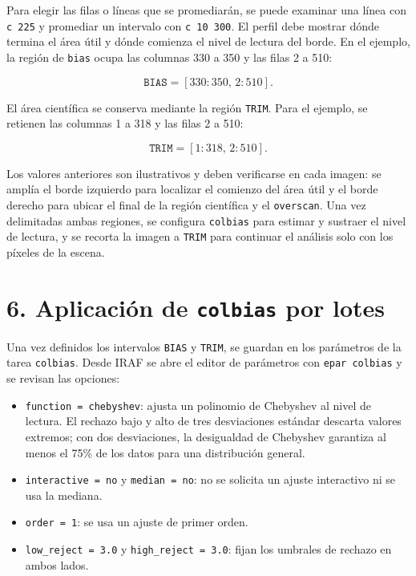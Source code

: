 \documentclass[11pt,twocolumn]{article}
\begin{document}
Para elegir las filas o líneas que se promediarán, se puede examinar una línea
con \texttt{c 225} y promediar un intervalo con \texttt{c 10 300}. El perfil
debe mostrar dónde termina el área útil y dónde comienza el nivel de lectura
del borde. En el ejemplo, la región de \texttt{bias} ocupa las columnas 330 a
350 y las filas 2 a 510:

\[
  \texttt{BIAS} = [330:350,\,2:510].
\]

El área científica se conserva mediante la región \texttt{TRIM}. Para el
ejemplo, se retienen las columnas 1 a 318 y las filas 2 a 510:

\[
  \texttt{TRIM} = [1:318,\,2:510].
\]

Los valores anteriores son ilustrativos y deben verificarse en cada imagen:
se amplía el borde izquierdo para localizar el comienzo del área útil y el
borde derecho para ubicar el final de la región científica y el
\texttt{overscan}. Una vez delimitadas ambas regiones, se configura
\texttt{colbias} para estimar y sustraer el nivel de lectura, y se recorta la
imagen a \texttt{TRIM} para continuar el análisis solo con los píxeles de la
escena.


\section*{6. Aplicación de \texttt{colbias} por lotes}

Una vez definidos los intervalos \texttt{BIAS} y \texttt{TRIM}, se guardan en
los parámetros de la tarea \texttt{colbias}. Desde IRAF se abre el editor de
parámetros con \texttt{epar colbias} y se revisan las opciones:

\begin{itemize}
  \item \texttt{function = chebyshev}: ajusta un polinomio de Chebyshev al
  nivel de lectura. El rechazo bajo y alto de tres desviaciones estándar
  descarta valores extremos; con dos desviaciones, la desigualdad de
  Chebyshev garantiza al menos el 75\% de los datos para una distribución
  general.
  \item \texttt{interactive = no} y \texttt{median = no}: no se solicita un
  ajuste interactivo ni se usa la mediana.
  \item \texttt{order = 1}: se usa un ajuste de primer orden.
  \item \texttt{low\_reject = 3.0} y \texttt{high\_reject = 3.0}: fijan los
  umbrales de rechazo en ambos lados.
\end{itemize}
\end{document}
